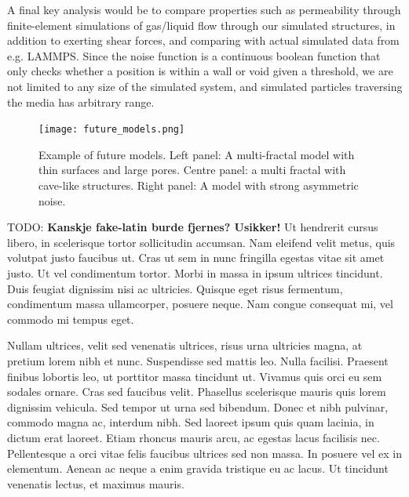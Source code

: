 \documentclass[aps,pre,twocolumn,letterpaper,floatfix,showpacs]{revtex4}
\newcommand{\todo}[1]{ {\color{Magenta} TODO: \color{Blue} \textbf{#1} }}
\begin{document}
A final key analysis would be to compare properties such as permeability through finite-element simulations of gas/liquid flow through our simulated structures, in addition to exerting shear forces, and comparing with actual simulated data from e.g. LAMMPS. Since the noise function is a continuous boolean function that only checks whether a position is within a wall or void given a threshold, we are not limited to any size of the simulated system, and simulated particles traversing the media has arbitrary range.  



\begin{figure}
\texttt{[image: future\_models.png]}
\caption{Example of future models. Left panel: A multi-fractal model with thin surfaces and large pores. Centre panel: a multi fractal with cave-like structures. Right panel: A model with strong asymmetric noise. }
\label{fig:future_models}
\end{figure}

\todo{Kanskje fake-latin burde fjernes? Usikker!}
Ut hendrerit cursus libero, in scelerisque tortor sollicitudin accumsan. Nam eleifend velit metus, quis volutpat justo faucibus ut. Cras ut sem in nunc fringilla egestas vitae sit amet justo. Ut vel condimentum tortor. Morbi in massa in ipsum ultrices tincidunt. Duis feugiat dignissim nisi ac ultricies. Quisque eget risus fermentum, condimentum massa ullamcorper, posuere neque. Nam congue consequat mi, vel commodo mi tempus eget.

Nullam ultrices, velit sed venenatis ultrices, risus urna ultricies magna, at pretium lorem nibh et nunc. Suspendisse sed mattis leo. Nulla facilisi. Praesent finibus lobortis leo, ut porttitor massa tincidunt ut. Vivamus quis orci eu sem sodales ornare. Cras sed faucibus velit. Phasellus scelerisque mauris quis lorem dignissim vehicula. Sed tempor ut urna sed bibendum. Donec et nibh pulvinar, commodo magna ac, interdum nibh. Sed laoreet ipsum quis quam lacinia, in dictum erat laoreet. Etiam rhoncus mauris arcu, ac egestas lacus facilisis nec. Pellentesque a orci vitae felis faucibus ultrices sed non massa. In posuere vel ex in elementum. Aenean ac neque a enim gravida tristique eu ac lacus. Ut tincidunt venenatis lectus, et maximus mauris.
\end{document}
